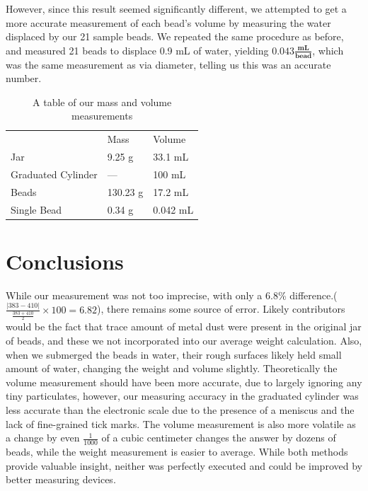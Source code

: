 \documentclass[12pt,letterpaper]{article}
\begin{document}
However, since this result seemed significantly different, we attempted to get a more accurate measurement of each bead's volume by measuring the water displaced by our 21 sample beads. We repeated the same procedure as before, and measured 21 beads to displace 0.9 mL of water, yielding $\mathbf{0.043} \frac{\textbf{mL}}{\textbf{bead}}$, which was the same measurement as via diameter, telling us this was an accurate number.

\begin{table}[h]
\centering
\begin{tabular}{lll}
                                        & Mass                         & Volume                         \\ \cline{2-3} 
\multicolumn{1}{l|}{Jar}                & \multicolumn{1}{l|}{9.25 g}  & \multicolumn{1}{l|}{33.1 mL}   \\ \cline{2-3} 
\multicolumn{1}{l|}{Graduated Cylinder} & \multicolumn{1}{l|}{—}       & \multicolumn{1}{l|}{100 mL}    \\ \cline{2-3} 
\multicolumn{1}{l|}{Beads}              & \multicolumn{1}{l|}{130.23 g} & \multicolumn{1}{l|}{17.2 mL}   \\ \cline{2-3} 
\multicolumn{1}{l|}{Single Bead}        & \multicolumn{1}{l|}{0.34 g}  & \multicolumn{1}{l|}{0.042 mL} \\ \cline{2-3} 
\end{tabular}
\caption{A table of our mass and volume measurements}
\label{tab:measure}
\end{table}

\pagebreak
\section{Conclusions}

While our measurement was not too imprecise, with only a 6.8\% difference.($\frac{|383-410|}{\frac{383+410}{2}}\times100 = 6.82$), there remains some source of error. Likely contributors would be the fact that trace amount of metal dust were present in the original jar of beads, and these we not incorporated into our average weight calculation. Also, when we submerged the beads in water, their rough surfaces likely held small amount of water, changing the weight and volume slightly. Theoretically the volume measurement should have been more accurate, due to largely ignoring any tiny particulates, however, our measuring accuracy in the graduated cylinder was less accurate than the electronic scale due to the presence of a meniscus and the lack of fine-grained tick marks. The volume measurement is also more volatile as a change by even $\frac{1}{1000}$ of a cubic centimeter changes the answer by dozens of beads, while the weight measurement is easier to average. While both methods provide valuable insight, neither was perfectly executed and could be improved by better measuring devices.


% 
% 
\end{document}
